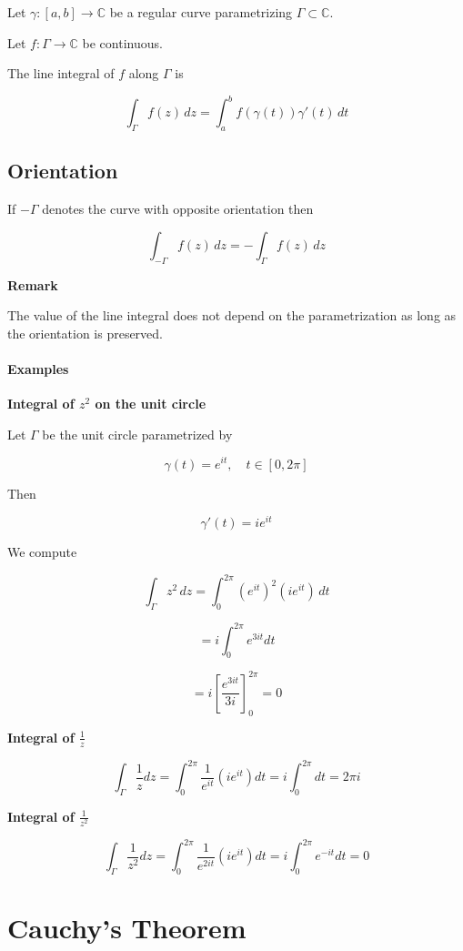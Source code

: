 Let $\gamma : [a,b] \to \mathbb{C}$ be a regular curve parametrizing $\Gamma \subset \mathbb{C}$.

Let $f : \Gamma \to \mathbb{C}$ be continuous.

\begin{definition}
The line integral of $f$ along $\Gamma$ is

\[
\int_\Gamma f(z)\,dz
=
\int_a^b f(\gamma(t))\gamma'(t)\,dt
\]
\end{definition}

\subsection*{Orientation}

If $-\Gamma$ denotes the curve with opposite orientation then

\[
\int_{-\Gamma} f(z)\,dz
=
-\int_\Gamma f(z)\,dz
\]

\textbf{Remark}

The value of the line integral does not depend on the parametrization as long as the orientation is preserved.

\paragraph{Examples}

\textbf{Integral of $z^2$ on the unit circle}

Let $\Gamma$ be the unit circle parametrized by

\[
\gamma(t) = e^{it}, \quad t \in [0,2\pi]
\]

Then

\[
\gamma'(t) = i e^{it}
\]

We compute

\[
\int_\Gamma z^2\,dz
=
\int_0^{2\pi} (e^{it})^2 (i e^{it})\,dt
\]

\[
=
i \int_0^{2\pi} e^{3it}dt
\]

\[
=
i \left[\frac{e^{3it}}{3i}\right]_0^{2\pi} = 0
\]

\textbf{Integral of $\frac{1}{z}$}

\[
\int_\Gamma \frac{1}{z}dz
=
\int_0^{2\pi}
\frac{1}{e^{it}}(i e^{it})dt
=
i\int_0^{2\pi}dt
=
2\pi i
\]

\textbf{Integral of $\frac{1}{z^2}$}

\[
\int_\Gamma \frac{1}{z^2}dz
=
\int_0^{2\pi}
\frac{1}{e^{2it}}(i e^{it})dt
=
i\int_0^{2\pi} e^{-it}dt
=
0
\]

\section{Cauchy's Theorem}

